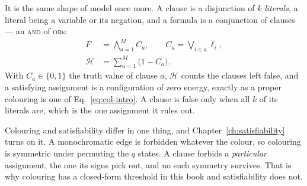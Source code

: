 It is the same shape of model once more. A clause is a disjunction of $k$
\emph{literals}, a literal being a variable or its negation, and a formula is a
conjunction of clauses --- an \textsc{and} of \textsc{or}s:
\begin{equation}
  \begin{aligned}
    F&=\bigwedge_{a=1}^{M}C_{a},
      \qquad C_{a}=\bigvee_{i\in a}\ell_{i},\\
    \mathcal{H}&=\sum_{a=1}^{M}\bigl(1-C_{a}\bigr).
  \end{aligned}
  \label{eq:sat-intro}
\end{equation}
With $C_{a}\in\{0,1\}$ the truth value of clause $a$, $\mathcal{H}$ counts the
clauses left false, and a satisfying assignment is a configuration of zero
energy, exactly as a proper colouring is one of Eq.~\eqref{eq:col-intro}. A
clause is false only when all $k$ of its literals are, which is the one
assignment it rules out.

Colouring and satisfiability differ in one thing, and Chapter~\ref{ch:satisfiability}
turns on it. A monochromatic edge is forbidden whatever the colour, so colouring
is symmetric under permuting the $q$ states. A clause forbids a
\emph{particular} assignment, the one its signs pick out, and no such symmetry
survives. That is why colouring has a closed-form threshold in this book and
satisfiability does not.

